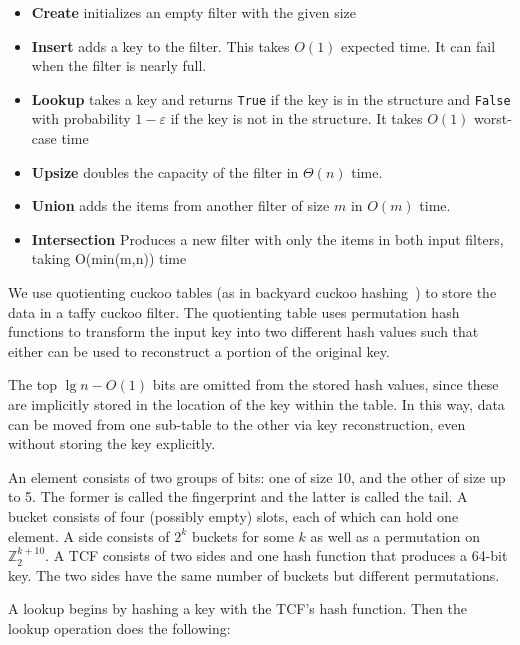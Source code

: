 \documentclass[manuscript,screen,review]{acmart}
\newcommand{\ints}{\mathbb{Z}}
\begin{document}
\begin{itemize}
\item {\bf Create} initializes an empty filter with the given size
\item {\bf Insert} adds a key to the filter.
  This takes $O(1)$ expected time.
  It can fail when the filter is nearly full.
\item {\bf Lookup} takes a key and returns \verb|True| if the key is in the structure and \verb|False| with probability $1-\varepsilon$ if the key is not in the structure.
  It takes $O(1)$ worst-case time
\item {\bf Upsize} doubles the capacity of the filter in $\Theta(n)$ time.
\item {\bf Union} adds the items from another filter of size $m$ in $O(m)$ time.
\item {\bf Intersection} Produces a new filter with only the items in both input filters, taking O(min(m,n)) time
\end{itemize}

We use quotienting cuckoo tables (as in backyard cuckoo hashing~\cite{backyard}) to store the data in a taffy cuckoo filter.
The quotienting table uses permutation hash functions to transform the input key into two different hash values such that either can be used to reconstruct a portion of the original key.

The top $\lg n - O(1)$ bits are omitted from the stored hash values, since these are implicitly stored in the location of the key within the table.
In this way, data can be moved from one sub-table to the other via key reconstruction, even without storing the key explicitly.

An element consists of two groups of bits: one of size 10, and the other of size up to 5.
The former is called the fingerprint and the latter is called the tail.
A bucket consists of four (possibly empty) slots, each of which can hold one element.
A side consists of $2^k$ buckets for some $k$ as well as a permutation on $\ints_2^{k+10}$. %
A TCF consists of two sides and one hash function that produces a 64-bit key.
The two sides have the same number of buckets but different permutations.

A lookup begins by hashing a key with the TCF's hash function.
Then the lookup operation does the following:
\end{document}
